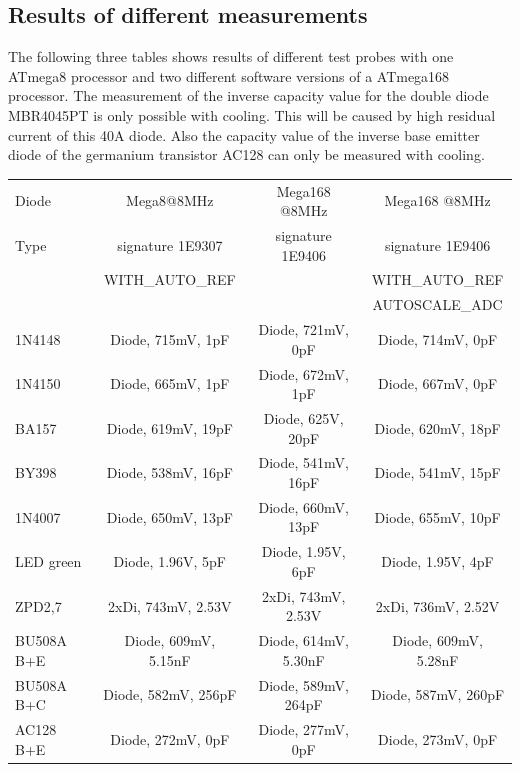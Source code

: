 \subsection{Results of different measurements}
The following three tables shows results of different test probes 
with one ATmega8 processor and two different software versions of a ATmega168 processor.
The measurement of the inverse capacity value for the double diode MBR4045PT is 
only possible with cooling. This will be caused by high residual current of this 40A diode.
Also the capacity value of the inverse base emitter diode of the germanium transistor AC128 can
only be measured with cooling.

\begin{table}[H]
  \begin{center}
    \begin{tabular}{| l | c | c | c |}
    \hline
     Diode & Mega8@8MHz & Mega168 @8MHz & Mega168 @8MHz \\
     Type  & signature 1E9307 & signature 1E9406 & signature 1E9406 \\
           & WITH\_AUTO\_REF &  & WITH\_AUTO\_REF \\
           &                 &  & AUTOSCALE\_ADC \\
    \hline
    \hline
1N4148     & Diode, 715mV, 1pF    & Diode, 721mV, 0pF   & Diode, 714mV, 0pF  \\
    \hline
1N4150     & Diode, 665mV, 1pF    & Diode, 672mV, 1pF   & Diode, 667mV, 0pF  \\
    \hline
BA157      & Diode, 619mV, 19pF   & Diode, 625V, 20pF   & Diode, 620mV, 18pF \\
    \hline
BY398      & Diode, 538mV, 16pF   & Diode, 541mV, 16pF  & Diode, 541mV, 15pF \\
    \hline
1N4007     & Diode, 650mV, 13pF   & Diode, 660mV, 13pF  & Diode, 655mV, 10pF \\
    \hline
LED green  & Diode, 1.96V, 5pF   & Diode, 1.95V, 6pF   & Diode, 1.95V, 4pF \\
    \hline
ZPD2,7     & 2xDi, 743mV, 2.53V   & 2xDi, 743mV, 2.53V  & 2xDi, 736mV, 2.52V \\
    \hline
BU508A B+E & Diode, 609mV, 5.15nF & Diode, 614mV, 5.30nF & Diode, 609mV, 5.28nF\\
    \hline
BU508A B+C & Diode, 582mV, 256pF  & Diode, 589mV, 264pF & Diode, 587mV, 260pF\\
    \hline
AC128 B+E  & Diode, 272mV, 0pF    & Diode, 277mV, 0pF   & Diode, 273mV, 0pF  \\

\end{tabular}
\end{center}
\end{table}
